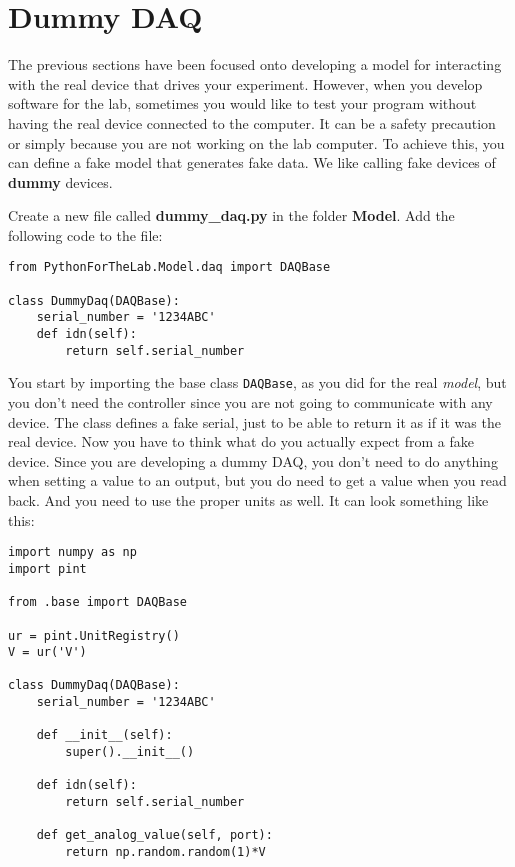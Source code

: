 {\section{Dummy DAQ}\label{dummy-daq}
The previous sections have been focused onto developing a model for interacting with the real device that drives your experiment. However, when you develop software for the lab, sometimes you would like to test your program without having the real device
connected to the computer. It can be a safety precaution or simply because you are not working on the lab computer. To achieve this, you
can define a fake model that generates fake data. We like calling fake devices of \textbf{dummy} devices. 

Create a new file called \textbf{dummy\_daq.py} in the folder \textbf{Model}. Add the following code to the file:

\begin{verbatim}
from PythonForTheLab.Model.daq import DAQBase

class DummyDaq(DAQBase):
    serial_number = '1234ABC'
    def idn(self):
        return self.serial_number
\end{verbatim}

You start by importing the base class \texttt{DAQBase}, as you did for
the real \emph{model}, but you don't need the controller since you are
not going to communicate with any device. The class defines a fake
serial, just to be able to return it as if it was the real device. Now
you have to think what do you actually expect from a fake device. Since
you are developing a dummy {DAQ}, you don't need to do anything when
setting a value to an output, but you do need to get a value when you
read back. And you need to use the proper units as well. It can look
something like this:

\begin{verbatim}
import numpy as np
import pint

from .base import DAQBase

ur = pint.UnitRegistry()
V = ur('V')

class DummyDaq(DAQBase):
    serial_number = '1234ABC'
    
    def __init__(self):
        super().__init__()
    
    def idn(self):
        return self.serial_number
    
    def get_analog_value(self, port):
        return np.random.random(1)*V
\end{verbatim}

}
